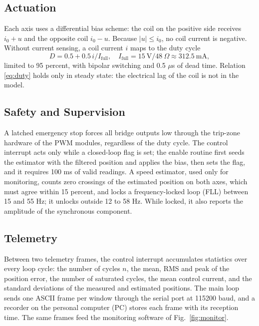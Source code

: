 \documentclass[conference]{IEEEtran}
\begin{document}
\subsection{Actuation}\label{sec:actuation}

Each axis uses a differential bias scheme: the coil on the positive side receives $i_0 + u$ and the opposite coil $i_0 - u$. Because $|u| \le i_0$, no coil current is negative. Without current sensing, a coil current $i$ maps to the duty cycle
\begin{equation}
D = 0.5 + 0.5\, i/I_\text{full}, \quad I_\text{full} = 15~\text{V}/48~\Omega \approx 312.5~\text{mA}, \label{eq:duty}
\end{equation}
limited to 95 percent, with bipolar switching and 0.5 $\mu$s of dead time. Relation \eqref{eq:duty} holds only in steady state: the electrical lag of the coil is not in the model.

\subsection{Safety and Supervision}

A latched emergency stop forces all bridge outputs low through the trip-zone hardware of the PWM modules, regardless of the duty cycle. The control interrupt acts only while a closed-loop flag is set; the enable routine first seeds the estimator with the filtered position and applies the bias, then sets the flag, and it requires 100 ms of valid readings. A speed estimator, used only for monitoring, counts zero crossings of the estimated position on both axes, which must agree within 15 percent, and locks a frequency-locked loop (FLL) between 15 and 55 Hz; it unlocks outside 12 to 58 Hz. While locked, it also reports the amplitude of the synchronous component.

\subsection{Telemetry}

Between two telemetry frames, the control interrupt accumulates statistics over every loop cycle: the number of cycles $n$, the mean, RMS and peak of the position error, the number of saturated cycles, the mean control current, and the standard deviations of the measured and estimated positions. The main loop sends one ASCII frame per window through the serial port at 115200 baud, and a recorder on the personal computer (PC) stores each frame with its reception time. The same frames feed the monitoring software of Fig.~\ref{fig:monitor}.
\end{document}
